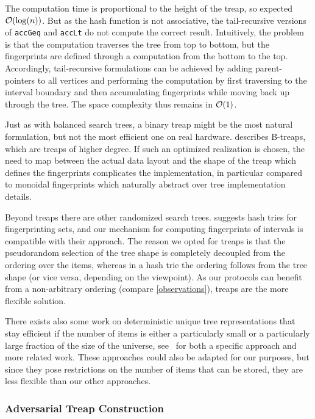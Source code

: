 The computation time is proportional to the height of the treap, so expected $\mathcal{O}(\log(n))$. But as the hash function is not associative, the tail-recursive versions of \texttt{accGeq} and \texttt{accLt} do not compute the correct result. Intuitively, the problem is that the computation traverses the tree from top to bottom, but the fingerprints are defined through a computation from the bottom to the top. Accordingly, tail-recursive formulations can be achieved by adding parent-pointers to all vertices and performing the computation by first traversing to the interval boundary and then accumulating fingerprints while moving back up through the tree. The space complexity thus remains in $\mathcal{O}(1)$.

Just as with balanced search trees, a binary treap might be the most natural formulation, but not the most efficient one on real hardware. \cite{golovin2009b} describes B-treaps, which are treaps of higher degree. If such an optimized realization is chosen, the need to map between the actual data layout and the shape of the treap which defines the fingerprints complicates the implementation, in particular compared to monoidal fingerprints which naturally abstract over tree implementation details.

Beyond treaps there are other randomized search trees. \cite{pugh1989incremental} suggests hash tries for fingerprinting sets, and our mechanism for computing fingerprints of intervals is compatible with their approach. The reason we opted for treaps is that the pseudorandom selection of the tree shape is completely decoupled from the ordering over the items, whereas in a hash trie the ordering follows from the tree shape (or vice versa, depending on the viewpoint). As our protocols can benefit from a non-arbitrary ordering (compare \cref{observations}), treaps are the more flexible solution.

There exists also some work on deterministic unique tree representations that stay efficient if the number of items is either a particularly small or a particularly large fraction of the size of the universe, see~\cite{sundar1994unique} for both a specific approach and more related work. These approaches could also be adapted for our purposes, but since they pose restrictions on the number of items that can be stored, they are less flexible than our other approaches.

\subsubsection{Adversarial Treap Construction}

